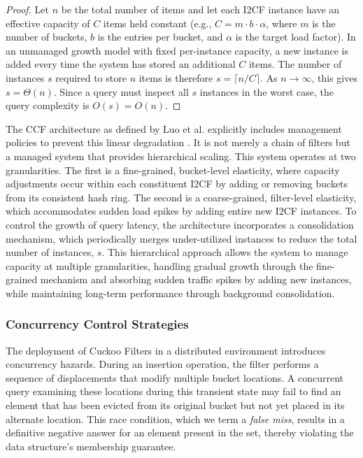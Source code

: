 \begin{proof}
    Let $n$ be the total number of items and let each I2CF instance have an effective capacity of $C$ items held constant (e.g., $C = m \cdot b \cdot \alpha$, where $m$ is the number of buckets, $b$ is the entries per bucket, and $\alpha$ is the target load factor). In an unmanaged growth model with fixed per-instance capacity, a new instance is added every time the system has stored an additional $C$ items. The number of instances $s$ required to store $n$ items is therefore $s = \lceil n/C \rceil$. As $n \to \infty$, this gives $s = \Theta(n)$. Since a query must inspect all $s$ instances in the worst case, the query complexity is $O(s) = O(n)$.
\end{proof}

The CCF architecture as defined by Luo et al. explicitly includes management policies to prevent this linear degradation \cite{Luo2021ACC}. It is not merely a chain of filters but a managed system that provides hierarchical scaling. This system operates at two granularities. The first is a fine-grained, bucket-level elasticity, where capacity adjustments occur within each constituent I2CF by adding or removing buckets from its consistent hash ring. The second is a coarse-grained, filter-level elasticity, which accommodates sudden load spikes by adding entire new I2CF instances. To control the growth of query latency, the architecture incorporates a consolidation mechanism, which periodically merges under-utilized instances to reduce the total number of instances, $s$. This hierarchical approach allows the system to manage capacity at multiple granularities, handling gradual growth through the fine-grained mechanism and absorbing sudden traffic spikes by adding new instances, while maintaining long-term performance through background consolidation.

\subsubsection{Concurrency Control Strategies}

The deployment of Cuckoo Filters in a distributed environment introduces concurrency hazards. During an insertion operation, the filter performs a sequence of displacements that modify multiple bucket locations. A concurrent query examining these locations during this transient state may fail to find an element that has been evicted from its original bucket but not yet placed in its alternate location. This race condition, which we term a \emph{false miss}, results in a definitive negative answer for an element present in the set, thereby violating the data structure's membership guarantee.

